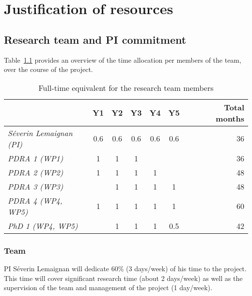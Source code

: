 \chapter{Justification of resources}


\section{Research team and PI commitment}

Table~\ref{time-allocation-team} provides an overview of the time allocation per
members of the team, over the course of the project.

\begin{table}[h!]
    \centering
\begin{tabular}{@{}lccccccr@{}}
\toprule
\textit{\textbf{}}              & \textbf{Y1} & \textbf{Y2} & \textbf{Y3} & \textbf{Y4} & \textbf{Y5} &  & \textbf{Total months} \\ \midrule
\textit{Séverin Lemaignan (PI)} & 0.6         & 0.6         & 0.6         & 0.6    & 0.6         &  & 36                    \\ \midrule
\textit{PDRA 1 (WP1)}       & 1           & 1           & 1           &             &             &  & 36                    \\
\textit{PDRA 2 (WP2)}       & 1           & 1           & 1           & 1           &             &  & 48                    \\
\textit{PDRA 3 (WP3)}       &             & 1           & 1           & 1           & 1           &  & 48                    \\
\textit{PDRA 4 (WP4, WP5)}  & 1           & 1           & 1           & 1           & 1           &  & 60                    \\
\textit{PhD 1 (WP4, WP5)}       &             & 1           & 1           & 1           & 0.5         &  & 42                    \\ \bottomrule
\end{tabular}
    \caption{Full-time equivalent for the research team members}
    \label{time-allocation-team}
\end{table}




\subsection{Team}

PI Séverin Lemaignan will dedicate 60\% (3 days/week) of his time to the project. This time will cover 
significant research time (about 2 days/week) as well as the supervision of the team and management 
of the project (1 day/week).

